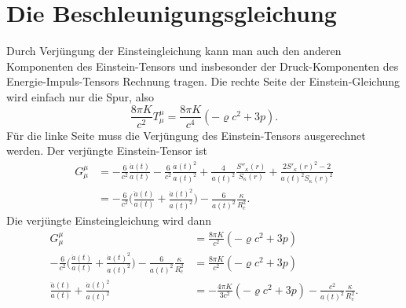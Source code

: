\section{Die Beschleunigungsgleichung}
Durch Verjüngung der Einsteingleichung kann man auch den anderen
Komponenten des Einstein-Tensors und insbesonder der Druck-Komponenten 
des Energie-Impuls-Tensors Rechnung tragen.
Die rechte Seite der Einstein-Gleichung wird einfach nur die
Spur, also
\[
\frac{8\pi K}{c^2}
T^\mu_\mu = \frac{8\pi K}{c^4}(-\varrho c^2 + 3p).
\]
Für die linke Seite muss die Verjüngung des Einstein-Tensors ausgerechnet
werden.
Der verjüngte Einstein-Tensor ist
\begin{align*}
G^\mu_\mu
&=
- \frac{6}{c^2} \frac{\ddot a(t)}{a(t)}
-\frac{6}{c^2} \frac{\dot a(t)^2}{a(t)^2}
+\frac{4}{a(t)^2} \frac{S''_\kappa(r)}{S_\kappa(r)}
+\frac{2S'_\kappa(r)^2-2}{a(t)^2 S_\kappa(r)^2}
\\
&=
-\frac{6}{c^2}\biggl(\frac{\ddot a(t)}{a(t)} + \frac{\dot a(t)^2}{a(t)^2}\biggr)
-\frac{6}{a(t)^2}\frac{\kappa }{R_c^2}.
\end{align*}
Die verjüngte Einsteingleichung wird dann
\begin{align*}
G^\mu_\mu
&=
\frac{8\pi K}{c^2}(-\varrho  c^2+ 3p)
\\
-\frac{6}{c^2}\biggl(\frac{\ddot a(t)}{a(t)} + \frac{\dot a(t)^2}{a(t)^2}\biggr)
-\frac{6}{a(t)^2}\frac{\kappa }{R_c^2}
&=
\frac{8\pi K}{c^2}(-\varrho c^2 + 3p)
\\
\frac{\ddot a(t)}{a(t)} + \frac{\dot a(t)^2}{a(t)^2}
&=
-\frac{4\pi K}{3c^2}(-\varrho c^2 + 3p)
-\frac{c^2}{a(t)^2}\frac{\kappa }{R_c^2}.
\end{align*}
